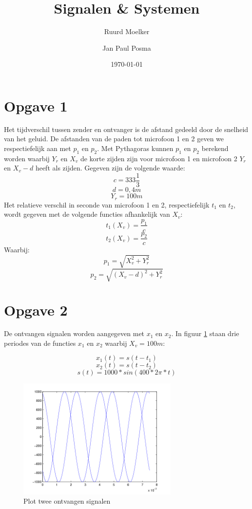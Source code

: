 \documentclass{article}
\author{Ruurd Moelker \and Jan Paul Posma}
\date{\today}
\title{Signalen \& Systemen}
\begin{document}
\maketitle 

\section{Opgave 1}
Het tijdverschil tussen zender en ontvanger is de afstand gedeeld door de
snelheid van het geluid. De afstanden van de paden tot microfoon 1 en 2 geven
we respectiefelijk aan met $p_{1}$ en $p_{2}$. Met Pythagoras kunnen $p_{1}$ en
$p_{2}$ berekend worden waarbij $Y_r$ en $X_v$ de korte zijden zijn voor
microfoon 1 en microfoon 2 $Y_{r}$ en $X_{v}-d$ heeft als zijden. Gegeven zijn de volgende
waarde: $$c = 333\frac{1}{3}$$ $$d = 0,4m$$ $$Y_{r} = 100m$$ Het relatieve
verschil in seconde van microfoon 1 en 2, respectiefelijk $t_1$ en $t_2$, wordt
gegeven met de volgende functies afhankelijk van $X_v$: $$t_{1}(X_{v}) =
\frac{p_{1}}{c}$$ $$t_{2}(X_{v}) = \frac{p_{2}}{c}$$ Waarbij: $$p_{1} =
\sqrt{X_{v}^{2} + Y_{r}^{2}}$$ $$p_{2} = \sqrt{(X_{v}-d)^{2} + Y_{r}^{2}}$$

\newpage
\section{Opgave 2}
De ontvangen signalen worden aangegeven met $x_{1}$ en $x_{2}$. In figuur
\ref{2a} staan drie periodes van de functies $x_{1}$ en $x_{2}$ waarbij $X_{v}
= 100m$:

$$x_{1}(t) = s(t - t_1)$$ $$x_{2}(t) = s(t - t_{2})$$ $$s(t) =
1000*sin(400*2\pi*t)$$


\begin{figure}[h]
	\center
	\begin{center}
	\includegraphics[width = 8cm]{2a.png}
	\caption{Plot twee ontvangen signalen}
	\end{center}
 \label{2a}
\end{figure}
\end{document}
